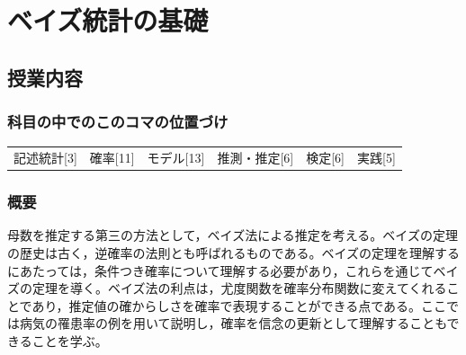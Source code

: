 \section{ベイズ統計の基礎}
\label{s25_bayesian1}
\subsection{授業内容}
\subsubsection{科目の中でのこのコマの位置づけ}
\begin{tabular}[t]{cccccc}
	記述統計[3] & 確率[11] & モデル[13] & 推測・推定[6] & 検定[6] & 実践[5]
\end{tabular}
\subsubsection{概要}
母数を推定する第三の方法として，ベイズ法による推定を考える。ベイズの定理の歴史は古く，逆確率の法則とも呼ばれるものである。ベイズの定理を理解するにあたっては，条件つき確率について理解する必要があり，これらを通じてベイズの定理を導く。ベイズ法の利点は，尤度関数を確率分布関数に変えてくれることであり，推定値の確からしさを確率で表現することができる点である。ここでは病気の罹患率の例を用いて説明し，確率を信念の更新として理解することもできることを学ぶ。
